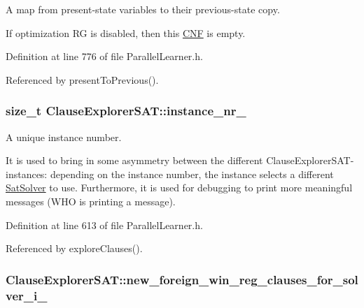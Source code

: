 A map from present-\/state variables to their previous-\/state copy. 

If optimization R\-G is disabled, then this \hyperlink{classCNF}{C\-N\-F} is empty. 

Definition at line 776 of file Parallel\-Learner.\-h.



Referenced by present\-To\-Previous().

\hypertarget{classClauseExplorerSAT_ab9ff4163b38a8ce70e07b78ea2e76cc2}{
\subsubsection[{instance\-\_\-nr\-\_\-}]{\setlength{\rightskip}{0pt plus 5cm}size\-\_\-t Clause\-Explorer\-S\-A\-T\-::instance\-\_\-nr\-\_\-\hspace{0.3cm}{\ttfamily [protected]}}}\label{classClauseExplorerSAT_ab9ff4163b38a8ce70e07b78ea2e76cc2}


A unique instance number. 

It is used to bring in some asymmetry between the different Clause\-Explorer\-S\-A\-T-\/instances\-: depending on the instance number, the instance selects a different \hyperlink{classSatSolver}{Sat\-Solver} to use. Furthermore, it is used for debugging to print more meaningful messages (W\-H\-O is printing a message). 

Definition at line 613 of file Parallel\-Learner.\-h.



Referenced by explore\-Clauses().

\hypertarget{classClauseExplorerSAT_a70c8edd590d75994ee354d591909cd35}{
\subsubsection[{new\-\_\-foreign\-\_\-win\-\_\-reg\-\_\-clauses\-\_\-for\-\_\-solver\-\_\-i\-\_\-}]{ Clause\-Explorer\-S\-A\-T\-::new\-\_\-foreign\-\_\-win\-\_\-reg\-\_\-clauses\-\_\-for\-\_\-solver\-\_\-i\-\_\-\hspace{0.3cm}{\ttfamily [protected]}}}\label{classClauseExplorerSAT_a70c8edd590d75994ee354d591909cd35}


